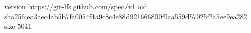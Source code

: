 version https://git-lfs.github.com/spec/v1
oid sha256:ea3aec4ab5b7fa0054f4a9c8c4e88d921666890f9aa559d57025f2a5ee9ea282
size 5041
